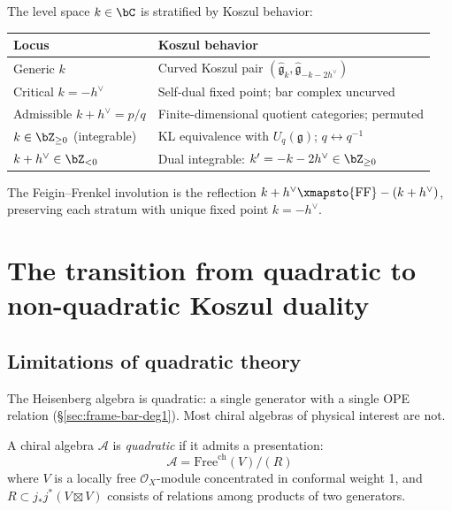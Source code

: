 \begin{remark}\label{rem:critical-locus}
The level space $k \in \bC$ is stratified by Koszul behavior:
\begin{center}
\begin{tabular}{ll}
\textbf{Locus} & \textbf{Koszul behavior} \\
\hline
Generic $k$ & Curved Koszul pair $(\widehat{\mathfrak{g}}_k, \widehat{\mathfrak{g}}_{-k-2h^\vee})$ \\
Critical $k = -h^\vee$ & Self-dual fixed point; bar complex uncurved \\
Admissible $k + h^\vee = p/q$ & Finite-dimensional quotient categories; permuted \\
$k \in \bZ_{\geq 0}$ (integrable) & KL equivalence with $U_q(\mathfrak{g})$; $q \leftrightarrow q^{-1}$ \\
$k + h^\vee \in \bZ_{<0}$ & Dual integrable: $k' = -k-2h^\vee \in \bZ_{\geq 0}$
\end{tabular}
\end{center}
The Feigin--Frenkel involution is the reflection $k + h^\vee \xmapsto{\mathrm{FF}} -(k + h^\vee)$, preserving each stratum with unique fixed point $k = -h^\vee$.
\end{remark}


\section{The transition from quadratic to non-quadratic Koszul duality}

\subsection{Limitations of quadratic theory}

The Heisenberg algebra is quadratic: a single generator with a single OPE relation (\S\ref{sec:frame-bar-deg1}).  Most chiral algebras of physical interest are not.

\begin{definition}
A chiral algebra $\mathcal{A}$ is \emph{quadratic} if it admits a presentation:
\[
\mathcal{A} = \text{Free}^{\text{ch}}(V)/(R)
\]
where $V$ is a locally free $\mathcal{O}_X$-module concentrated in conformal weight 1, and $R \subset j_*j^*(V \boxtimes V)$ consists of relations among products of two generators.
\end{definition}

